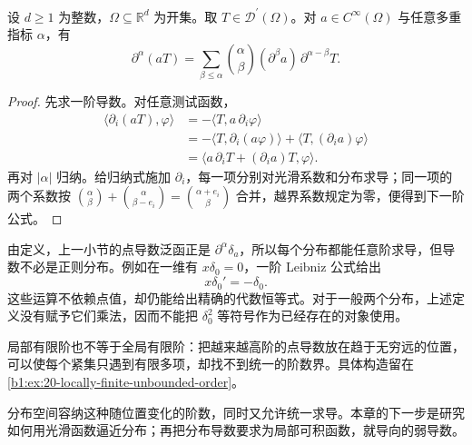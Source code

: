 \begin{proposition}[Leibniz 公式]\label{b1:prop:distribution-leibniz}
设 \(d\geq1\) 为整数，\(\Omega\subseteq\mathbb R^d\) 为开集。取 \(T\in\mathcal D^{\prime}(\Omega)\)。对 \(a\in C^\infty(\Omega)\) 与任意多重指标 \(\alpha\)，有
\[
 \partial^\alpha(aT)
 =\sum_{\beta\leq\alpha}\binom{\alpha}{\beta}
      (\partial^\beta a)\,\partial^{\alpha-\beta}T.
\]
\end{proposition}
\begin{proof}
先求一阶导数。对任意测试函数，
\[
 \begin{aligned}
 \langle\partial_i(aT),\varphi\rangle
 &=-\langle T,a\,\partial_i\varphi\rangle\\
 &=-\langle T,\partial_i(a\varphi)\rangle
       +\langle T,(\partial_i a)\varphi\rangle\\
 &=\langle a\,\partial_iT+(\partial_i a)T,\varphi\rangle.
 \end{aligned}
\]
再对 \(|\alpha|\) 归纳。给归纳式施加 \(\partial_i\)，每一项分别对光滑系数和分布求导；同一项的两个系数按
\(\binom{\alpha}{\beta}+\binom{\alpha}{\beta-e_i}
=\binom{\alpha+e_i}{\beta}\)
合并，越界系数规定为零，便得到下一阶公式。
\end{proof}

由定义，上一小节的点导数泛函正是 \(\partial^\alpha\delta_a\)，所以每个分布都能任意阶求导，但导数不必是正则分布。例如在一维有 \(x\delta_0=0\)，一阶 Leibniz 公式给出
\[
 x\delta_0'=-\delta_0.
\]
这些运算不依赖点值，却仍能给出精确的代数恒等式。对于一般两个分布，上述定义没有赋予它们乘法，因而不能把 \(\delta_0^2\) 等符号作为已经存在的对象使用。

\ProseParagraphBreak

局部有限阶也不等于全局有限阶：把越来越高阶的点导数放在趋于无穷远的位置，可以使每个紧集只遇到有限多项，却找不到统一的阶数界。具体构造留在\cref{b1:ex:20-locally-finite-unbounded-order}。

\ProseParagraphBreak

分布空间容纳这种随位置变化的阶数，同时又允许统一求导。本章的下一步是研究如何用光滑函数逼近分布；再把分布导数要求为局部可积函数，就导向的弱导数。
